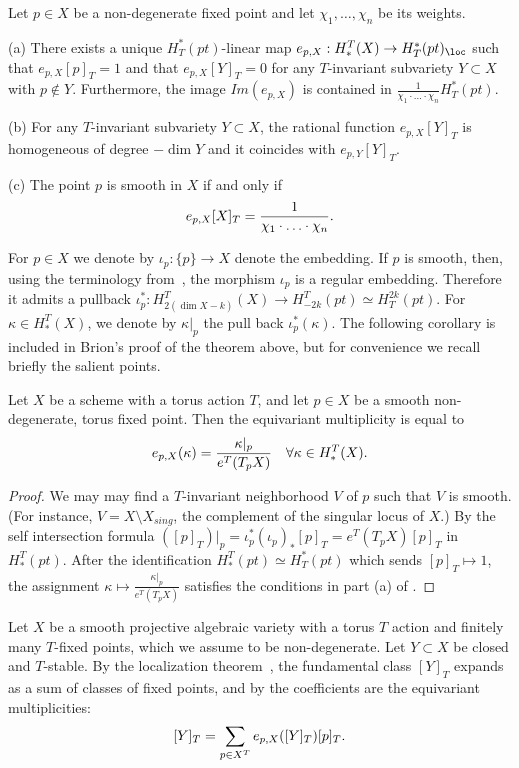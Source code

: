 \begin{theorem}[Brion]\label{thm:def-eq-m}  Let $p \in X$ be a non-degenerate fixed point and let $\chi_1, 
	\ldots, \chi_n$ be its weights. 
	
	(a) There exists a unique $H^*_T(pt)$-linear map $e_{p,X}: H_*^T(X) \to H^*_T(pt)_{\loc}$ such that 
	$e_{p,X}[p]_T =1$ and that $e_{p,X}[Y]_T = 0$ for any $T$-invariant subvariety $Y \subset X$ with $p \notin Y$. Furthermore, the image $Im(e_{p,X})$ is 
	contained in {$\frac{1}{\chi_1 \cdot \ldots \cdot \chi_n} H^*_T(pt)$}.
	
	(b) For any $T$-invariant subvariety $Y \subset X$, the rational function $e_{p,X}[Y]_T$
	is homogeneous of degree $-\dim Y$ and it coincides with $e_{p,Y}[Y]_T$.
	
	(c) The point $p$ is smooth in $X$ if and only if
	\[ e_{p,X}[X]_T =\frac{1}{\chi_1 \cdot \ldots \cdot \chi_n} \/. \]
	
\end{theorem}
{For $p \in X$ we denote by $\iota_p : \{ p \} \to X$ denote the embedding. If 
	$p$ is smooth, then, using the terminology from~\cite[\S B.7]{fulton:IT}, the morphism $\iota_p$ is a
	regular embedding. Therefore it admits a pullback 
	$\iota_p^*:H_{2(\dim X - k)}^T(X) \to H_{-2k}^T(pt) \simeq H^{2k}_T(pt)$. 
	For $\kappa \in H_*^T(X)$, we denote by $\kappa|_p$ the pull back $\iota_p^*(\kappa)$.
	The following corollary is included in Brion's proof of the theorem above, 
	but for convenience we recall briefly the salient points.}  
\begin{corol}\label{cor:eqmultsmooth} Let $X$ be a scheme with a torus action $T$, and let 
	$p \in X$ be a smooth non-degenerate, torus fixed point. Then the equivariant multiplicity is equal to
	\[ e_{p,X}(\kappa) = \frac{\kappa|_p}{e^T (T_p X) } \quad \forall \kappa \in H_*^T(X) \/. \]
\end{corol}
\begin{proof} We may 
	may find a $T$-invariant neighborhood $V$ of $p$ such that $V$ is smooth.
	(For instance, $V = X \setminus X_{sing}$, the complement of the singular locus of $X$.)
	By the self intersection formula $([p]_T)|_p= \iota_p^* (\iota_p)_*[p]_T = e^T (T_p X)[p]_T$ 
	in $H_*^T(pt)$. After the identification $H_*^T(pt) \simeq H^*_T(pt)$ which sends 
		$[p]_T \mapsto 1$, the assignment $\kappa \mapsto \frac{\kappa|_p}{e^T (T_p X) }$ 
		satisfies the conditions in part (a) of .
\end{proof}
{\begin{example} Let $X$ be a smooth projective
		algebraic variety with a torus $T$ action and finitely many $T$-fixed points,
		which we assume to be non-degenerate. Let $Y \subset X$ be closed and $T$-stable.
		By the localization theorem~\cite[Thm.~2]{edidin-graham:localization},
		the fundamental class $[Y]_T$ expands as a sum of classes of fixed points, and by
		 the coefficients are
		the equivariant multiplicities:
		\[ [Y]_T = \sum_{p \in X^T} e_{p,X}([Y]_T) [p]_T \/. \]
\end{example}}

